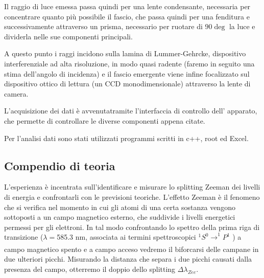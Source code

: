 \documentclass{article}
\begin{document}
	Il raggio di luce emessa passa quindi per una lente condensante, necessaria 
	per concentrare quanto più possibile il fascio, che passa quindi per una 
	fenditura e successivamente attraverso un prisma, necessario per ruotare di 
	$90\deg$ la luce e dividerla nelle sue componenti principali. 
	
	A questo punto i raggi incidono sulla lamina di Lummer-Gehrcke, dispositivo
	interferenziale ad alta risoluzione, in modo quasi
	radente (faremo in seguito una stima dell'angolo di incidenza) e il fascio 
	emergente viene infine focalizzato sul dispositivo ottico di lettura (un CCD
	monodimensionale) attraverso la lente di camera.
	
	
	L'acquisizione dei dati è avvenutatramite l'interfaccia di controllo dell'
	apparato, che permette di controllare le diverse componenti appena citate.
	
	Per l'analisi dati sono stati utilizzati programmi scritti in c++, root ed Excel.
	
	
	\subsection*{Compendio di teoria}
	
	L'esperienza è incentrata sull'identificare e misurare lo splitting 
	Zeeman dei livelli di energia e confrontarli con le previsioni teoriche.
	L'effetto Zeeman è il fenomeno che si verifica nel momento in cui gli
	atomi di una certa sostanza vengono sottoposti a un campo magnetico 
	esterno, che suddivide i livelli energetici permessi per gli elettroni.
	In tal modo confrontando lo spettro della prima riga di transizione 
	($\lambda = $585.3 nm, associata ai termini spettroscopici
	$^1S^0 \xrightarrow[]{}  ^1P^1$ ) a campo magnetico spento e a campo 
	acceso vedremo 
	il biforcarsi delle campane in due ulteriori picchi. Misurando la
	distanza che separa i due picchi causati dalla presenza del campo,
	otterremo il doppio dello splitting $\Delta\lambda_{Zee} $.
	
\end{document}
